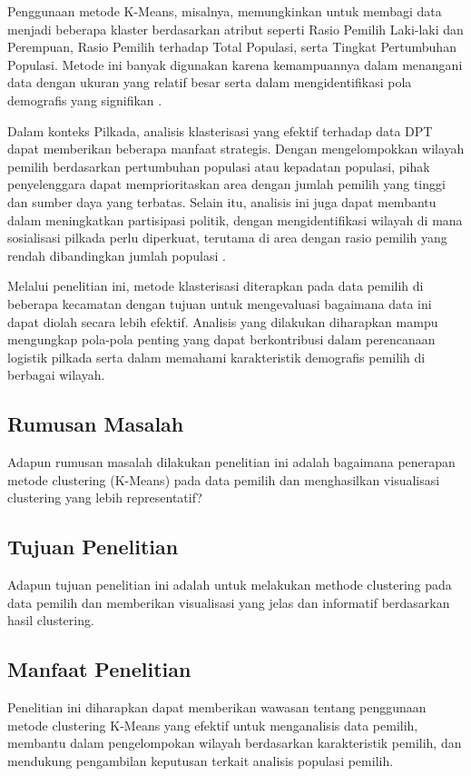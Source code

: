 Penggunaan metode K-Means, misalnya, memungkinkan untuk membagi data menjadi beberapa klaster berdasarkan atribut seperti Rasio Pemilih Laki-laki dan Perempuan, Rasio Pemilih terhadap Total Populasi, serta Tingkat Pertumbuhan Populasi. Metode ini banyak digunakan karena kemampuannya dalam menangani data dengan ukuran yang relatif besar serta dalam mengidentifikasi pola demografis yang signifikan \cite{ClusteringMethod}.

Dalam konteks Pilkada, analisis klasterisasi yang efektif terhadap data DPT dapat memberikan beberapa manfaat strategis. Dengan mengelompokkan wilayah pemilih berdasarkan pertumbuhan populasi atau kepadatan populasi, pihak penyelenggara dapat memprioritaskan area dengan jumlah pemilih yang tinggi dan sumber daya yang terbatas. Selain itu, analisis ini juga dapat membantu dalam meningkatkan partisipasi politik, dengan mengidentifikasi wilayah di mana sosialisasi pilkada perlu diperkuat, terutama di area dengan rasio pemilih yang rendah dibandingkan jumlah populasi \cite{ElectionParticipation}.

Melalui penelitian ini, metode klasterisasi diterapkan pada data pemilih di beberapa kecamatan dengan tujuan untuk mengevaluasi bagaimana data ini dapat diolah secara lebih efektif. Analisis yang dilakukan diharapkan mampu mengungkap pola-pola penting yang dapat berkontribusi dalam perencanaan logistik pilkada serta dalam memahami karakteristik demografis pemilih di berbagai wilayah.

\subsection{Rumusan Masalah}
Adapun rumusan masalah dilakukan penelitian ini adalah bagaimana penerapan metode clustering (K-Means) pada data pemilih dan menghasilkan visualisasi clustering yang lebih representatif?

\subsection{Tujuan Penelitian}
Adapun tujuan penelitian ini adalah untuk melakukan methode clustering pada data pemilih dan memberikan visualisasi yang jelas dan informatif berdasarkan hasil clustering.

\subsection{Manfaat Penelitian}
Penelitian ini diharapkan dapat memberikan wawasan tentang penggunaan metode clustering K-Means yang efektif untuk menganalisis data pemilih, membantu dalam pengelompokan wilayah berdasarkan karakteristik pemilih, dan mendukung pengambilan keputusan terkait analisis populasi pemilih.


